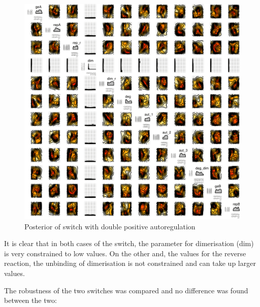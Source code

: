 \begin{figure}[htbp]
\begin{center}
\includegraphics[scale=0.15]{chapterStabilityFinder/mass_action_switches/bi_tri_same_priors/posterior_pos_ab_tri.png}
\caption{Posterior of switch with double positive autoregulation}\label{fig_3}
\end{center}
\end{figure}
\clearpage
It is clear that in both cases of the switch, the parameter for dimerisation (dim) is very constrained to low values. On the other and, the values for the reverse reaction, the unbinding of dimerisation is not constrained and can take up larger values. 

The robustness of the two switches was compared and no difference was found between the two:

